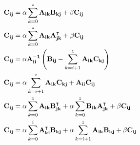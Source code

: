 \documentclass[conference]{IEEEtran}
\begin{document}
\begin{subequations}
\vspace{-0.27in}
 \label{L3_Tile_BLAS}
 \begin{align}
  \mathbf{C_{ij}} &= \alpha \sum \limits_{k=0}^{z} \mathbf{A_{ik}} \mathbf{B_{kj}}+\beta \mathbf{C_{ij}} \label{GEMM_e}               \\
  \mathbf{C_{ij}} &= \alpha \sum \limits_{k=0}^{z} \mathbf{A_{ik}} \mathbf{A_{jk}^\intercal}+\beta \mathbf{C_{ij}} \label{SYRK_e}     \\
  \mathbf{C_{ij}} &= \alpha \mathbf{A_{ii}^{-1}} \left( \mathbf{B_{ij}} - \sum \limits_{k=i+1}^{z} \mathbf{A_{ik}} \mathbf{C_{kj}} \right) \label{TRSM_e} \\    
  \mathbf{C_{ij}} &=\alpha \sum \limits_{k=i+1}^{z} \mathbf{A_{ik}} \mathbf{C_{kj}} + \mathbf{A_{ii}C_{ij}} \label{TRMM_e}              \\
  \mathbf{C_{ij}} &=\alpha \sum \limits_{k=0}^{z} \mathbf{A_{ik}} \mathbf{B_{jk}^\intercal} + \alpha \sum \limits_{k=0}^{z} \mathbf{B_{ik}} \mathbf{A_{jk}^\intercal} +\beta \mathbf{C_{ij}} \label{SYR2K_e}\\
  \mathbf{C_{ij}} &= \alpha \sum \limits_{k=0}^{i} \mathbf{A_{ki}^\intercal} \mathbf{B_{kj}} + \alpha \sum \limits_{k=i+1}^{z} \mathbf{A_{ik}} \mathbf{B_{kj}} + \beta \mathbf{C_{ij}} \label{SYMM_e} 
 \end{align}
\end{subequations}
\vspace{-0.18in}

\vspace{-0.12in}
\end{document}
